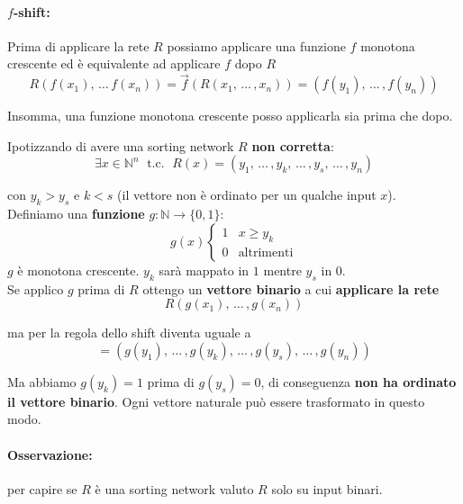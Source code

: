 	\paragraph{$f$-shift:} Prima di applicare la rete $R$ possiamo applicare una funzione $f$ monotona crescente ed è equivalente ad applicare $f$ dopo $R$
	$$ R \left(f(x_1), \, \dots \, f(x_n)\right) = \vec{f}\left(R(x_1, \, \dots \, , x_n)\right) = \left(f(y_1), \, \dots \, , f(y_n) \right) $$
	
	Insomma, una funzione monotona crescente posso applicarla sia prima che dopo.\\
	
	\newpage
	
	Ipotizzando di avere una sorting network $R$ \textbf{non corretta}: 
	$$ \exists x \in \mathbb{N}^n \; \text{ t.c. } \; R(x) = (y_1, \, \dots \, , y_k, \, \dots \, , y_s, \, \dots \, , y_n)$$
	
	con $y_k > y_s$ e $k<s$ (il vettore non è ordinato per un qualche input $x$).\\
	
	Definiamo una \textbf{funzione} $g: \mathbb{N} \rightarrow \{0,1\}$:
	$$ 
	g(x) \begin{cases}
		1  & x \geq y_k \\
		0 & \text{altrimenti}
	\end{cases}
	$$
	$g$ è monotona crescente. $y_k$ sarà mappato in $1$ mentre $y_s$ in $0$.\\
	
	Se applico $g$ prima di $R$ ottengo un \textbf{vettore binario} a cui \textbf{applicare la rete}
	$$ R\left(g(x_1), \, \dots \, , g(x_n)\right)$$
	
	ma per la regola dello shift diventa uguale a 
	$$ = \left(g(y_1), \, \dots \, , g(y_k), \, \dots \, , g(y_s), \, \dots \, , g(y_n) \right)$$
	
	Ma abbiamo $g(y_k) = 1$ prima di $g(y_s) = 0$, di conseguenza \textbf{non ha ordinato il vettore binario}. Ogni vettore naturale può essere trasformato in questo modo.\\
	
	\paragraph{Osservazione:} per capire se $R$ è una sorting network valuto $R$ solo su input binari.\\
	
